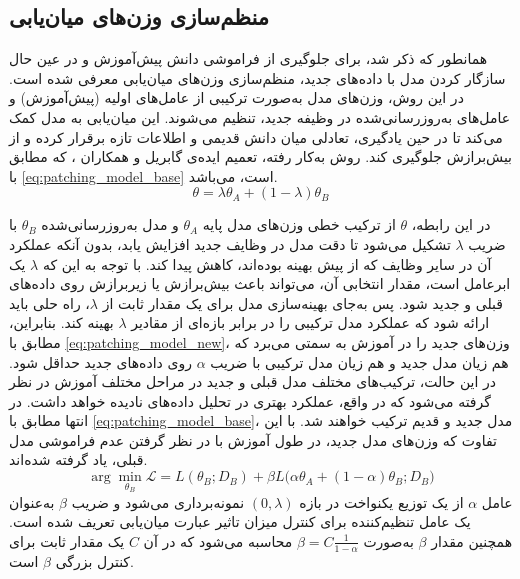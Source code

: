 \subsection{منظم‌سازی وزن‌های میان‌یابی}
همانطور که ذکر شد، برای جلوگیری از فراموشی دانش پیش‌آموزش و در عین حال سازگار کردن مدل با داده‌های جدید، منظم‌سازی وزن‌های میان‌یابی
 معرفی شده است. در این روش، وزن‌های مدل به‌صورت ترکیبی از عامل‌های اولیه (پیش‌آموزش) و عامل‌های به‌روزرسانی‌شده در وظیفه جدید، تنظیم می‌شوند. این میان‌یابی به مدل کمک می‌کند تا در حین یادگیری، تعادلی میان دانش قدیمی و اطلاعات تازه برقرار کرده و از بیش‌برازش
  جلوگیری کند. روش به‌کار رفته، تعمیم ایده‌ی گابریل و همکاران
  \cite{patchingmodels}،
 که مطابق با \eqref{eq:patching_model_base} است، می‌باشد.
\begin{equation}\label{eq:patching_model_base}
\theta = \lambda \theta_A + (1 - \lambda) \theta_B
\end{equation}

در این رابطه، $\theta$ از ترکیب خطی وزن‌های مدل پایه $\theta_A$ و مدل به‌روزرسانی‌شده $\theta_B$ با ضریب $\lambda$ تشکیل می‌شود تا دقت مدل در وظایف جدید افزایش یابد، بدون آنکه عملکرد آن در سایر وظایف که از پیش بهینه بوده‌اند، کاهش پیدا کند. با توجه به این که $\lambda$ یک ابرعامل  است، مقدار انتخابی آن، می‌تواند باعث بیش‌برازش یا زیربرازش روی داده‌های قبلی و جدید شود. پس به‌جای بهینه‌سازی مدل برای یک مقدار ثابت از $\lambda$، راه حلی باید ارائه شود که عملکرد مدل ترکیبی را در برابر بازه‌ای از مقادیر $\lambda$ بهینه کند. بنابراین، مطابق با \eqref{eq:patching_model_new}، وزن‌های جدید را در آموزش به سمتی می‌برد که هم زیان مدل جدید و هم زیان مدل ترکیبی با ضریب $\alpha$ روی داده‌های جدید حداقل شود. در این حالت، ترکیب‌های مختلف مدل قبلی و جدید در مراحل مختلف آموزش در نظر گرفته می‌شود که در واقع، عملکرد بهتری در تحلیل داده‌های نادیده خواهد داشت. در انتها مطابق با \eqref{eq:patching_model_base}، مدل جدید و قدیم ترکیب خواهند شد. با این تفاوت که وزن‌های مدل جدید، در طول آموزش با در نظر گرفتن عدم فراموشی مدل قبلی، یاد گرفته شده‌اند.
\begin{equation}\label{eq:patching_model_new}
	\arg \min_{\theta_B} \mathcal{L} =
	L(\theta_B; D_B) + \beta L\big(\alpha \theta_A + (1 - \alpha)\theta_B; D_B\big)
\end{equation}
عامل \( \alpha \) از یک توزیع یکنواخت در بازه \( (0, \lambda) \) نمونه‌برداری می‌شود و ضریب \( \beta \) به‌عنوان یک عامل تنظیم‌کننده برای کنترل میزان تاثیر عبارت میان‌یابی تعریف شده است. همچنین مقدار \( \beta \) به‌صورت \( \beta = C \frac{1}{1 - \alpha} \) محاسبه می‌شود که در آن \( C \) یک مقدار ثابت برای کنترل بزرگی \(\beta\) است. 

